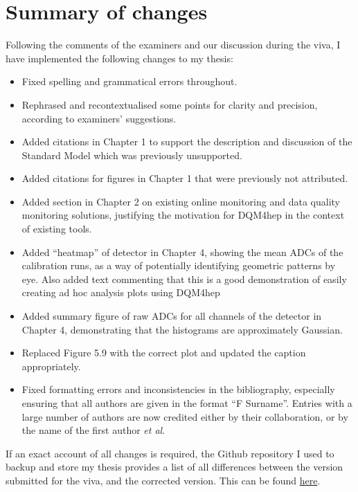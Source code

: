 \documentclass[
11pt, %
a4paper,
oneside,
]{scrartcl}
\begin{document}
\section*{Summary of changes}
Following the comments of the examiners and our discussion during the viva, I have implemented the following changes to my thesis:

\begin{itemize}
	\item Fixed spelling and grammatical errors throughout.
	\item Rephrased and recontextualised some points for clarity and precision, according to examiners' suggestions.
	\item Added citations in Chapter 1 to support the description and discussion of the Standard Model which was previously unsupported.
	\item Added citations for figures in Chapter 1 that were previously not attributed.
	\item Added section in Chapter 2 on existing online monitoring and data quality monitoring solutions, justifying the motivation for DQM4hep in the context of existing tools.
	\item Added ``heatmap'' of detector in Chapter 4, showing the mean ADCs of the calibration runs, as a way of potentially identifying geometric patterns by eye. Also added text commenting that this is a good demonstration of easily creating ad hoc analysis plots using DQM4hep
	\item Added summary figure of raw ADCs for all channels of the detector in Chapter 4, demonstrating that the histograms are approximately Gaussian.
	\item Replaced Figure 5.9 with the correct plot and updated the caption appropriately.
	\item Fixed formatting errors and inconsistencies in the bibliography, especially ensuring that all authors are given in the format ``F Surname''. Entries with a large number of authors are now credited either by their collaboration, or by the name of the first author \textit{et al}.
\end{itemize}

If an exact account of all changes is required, the Github repository I used to backup and store my thesis provides a list of all differences between the version submitted for the viva, and the corrected version. This can be found \href{https://github.com/tcoates3/thesis/compare/viva...corrections}{here}.
\end{document}
